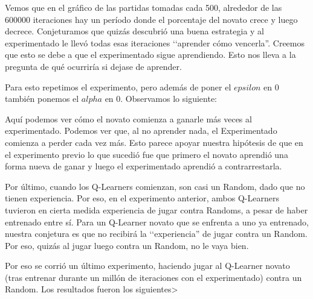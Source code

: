 Vemos que en el gráfico de las partidas tomadas cada 500, alrededor de las 600000 iteraciones hay un período donde el porcentaje del novato crece y luego decrece. Conjeturamos que quizás descubrió una buena estrategia y al experimentado le llevó todas esas iteraciones ‘‘aprender cómo vencerla''. Creemos que esto se debe a que el experimentado sigue aprendiendo. Esto nos lleva a la pregunta de qué ocurriría si dejase de aprender.

Para esto repetimos el experimento, pero además de poner el $epsilon$ en 0 también ponemos el $alpha$ en 0. Observamos lo siguiente:



Aquí podemos ver cómo el novato comienza a ganarle más veces al experimentado. Podemos ver que, al no aprender nada, el Experimentado comienza a perder cada vez más. Esto parece apoyar nuestra hipótesis de que en el experimento previo lo que sucedió fue que primero el novato aprendió una forma nueva de ganar y luego el experimentado aprendió a contrarrestarla.

Por último, cuando los Q-Learners comienzan, son casi un Random, dado que no tienen experiencia. Por eso, en el experimento anterior, ambos Q-Learners tuvieron en cierta medida experiencia de jugar contra Randoms, a pesar de haber entrenado entre sí. Para un Q-Learner novato que se enfrenta a uno ya entrenado, nuestra conjetura es que no recibirá la ‘‘experiencia'' de jugar contra un Random. Por eso, quizás al jugar luego contra un Random, no le vaya bien.

Por eso se corrió un último experimento, haciendo jugar al Q-Learner novato (tras entrenar durante un millón de iteraciones con el experimentado) contra un Random. Los resultados fueron los siguientes>


